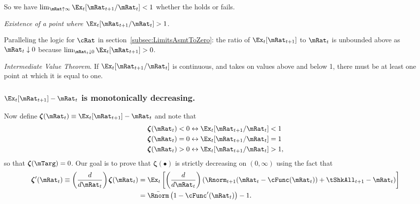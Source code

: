 \documentclass[\econtexRoot/BufferStockTheory]{subfiles}
\begin{document}
So we have $\lim_{\mRat \uparrow \infty} \Ex_{t}[\mRat_{t+1}/\mRat_{t}] < 1$ whether the {\RIC} holds or fails.

\medskip\medskip

\noindent \textit{Existence of a point where $\Ex_t [{\mRat}_{t+1}/\mRat_t] > 1$}.

Paralleling the logic for $\cRat$ in section~\ref{subsec:LimitsAsmtToZero}: the ratio of $\Ex_{t}[\mRat_{t+1}]$ to $\mRat_{t}$ is unbounded above as $\mRat_{t} \downarrow 0$ because $\lim_{\mRat_{t}\downarrow 0} \Ex_{t}[\mRat_{t+1}] > 0$.

\medskip\medskip

\noindent \textit{Intermediate Value Theorem}.  If $\Ex_t [{\mRat}_{t+1}/\mRat_t]$ is continuous, and takes on values above and below 1, there must be at least one point at which it is equal to one.

\subsubsection{$\Ex_t [{\mRat}_{t+1}] -\mRat_t$ is monotonically decreasing.}

Now define \providecommand{\difFunc}{\pmb{\zeta}} $\difFunc(\mRat_t) \equiv 
\Ex_t[\mRat_{t+1}] - \mRat_t$ and note that
\begin{equation}\begin{gathered}\begin{aligned}\label{eq:difRatioEquiv}
  \difFunc(\mRat_t) < 0 &\leftrightarrow \Ex_t[{\mRat}_{t+1}/\mRat_t] < 1 
                          \nonumber\\
  \difFunc(\mRat_t) = 0 &\leftrightarrow \Ex_t[{\mRat}_{t+1}/\mRat_t] = 1\\
  \difFunc(\mRat_t) > 0 &\leftrightarrow \Ex_t[{\mRat}_{t+1}/\mRat_t] > 
                          1,\nonumber
\end{aligned}\end{gathered}\end{equation}
so that $\difFunc(\mTarg)=0$. Our goal is to prove that $\difFunc(\bullet)$ is strictly 
decreasing on $(0,\infty)$ using the fact that
\begin{equation}\begin{gathered}\begin{aligned}
  \difFunc^{\prime}(\mRat_{t}) \equiv  \left( \frac{d}{d\mRat_{t}}\right) \difFunc(\mRat_t)  & = \Ex_{t}\left[
                                                                                               \left( \frac{d}{d\mRat_{t}}\right) \left( 
                                                                                               {\Rnorm}_{t+1}(\mRat_{t}-\cFunc(\mRat_{t}))+%
                                                                                               {\tShkAll}_{t+1} - {\mRat}_t\right) \right] \label{eq:difFuncDecreases} \\
                                                                                             & = \bar{\Rnorm}\left(1-\cFunc^{\prime}({\mRat}_t)\right) - 1.  \notag
\end{aligned}\end{gathered}\end{equation}
\end{document}
